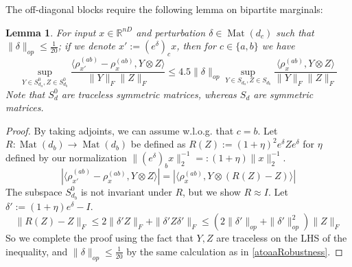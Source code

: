 \documentclass[aos]{imsart}
\newtheorem{lemma}[theorem]{Lemma}
\theoremstyle{definition}
\numberwithin{equation}{section}
\DeclareMathOperator{\Mat}{Mat}
\newcommand{\R}{{\mathbb{R}}}
\newcommand{\smallSym}{S}
\newcommand{\samp}{x}
\begin{document}
\begin{appendix}
The off-diagonal blocks require the following lemma on bipartite marginals:

\begin{lemma} \label{btoabRobustness}
For input $\samp \in \R^{nD}$ and perturbation $\delta \in \Mat(d_{c})$ such that $\|\delta\|_{op} \leq \frac{1}{20}$; if we denote $\samp' := (e^{\delta})_{c} \samp$, then for $c \in \{a,b\}$ we have
\[ \sup_{Y \in \smallSym_{d_{a}}^{0}, Z \in \smallSym_{d_{b}}^{0}} \frac{\langle \rho_{\samp'}^{(ab)} - \rho_{\samp}^{(ab)}, Y \otimes Z \rangle}{\|Y\|_{F} \|Z\|_{F}} \leq 4.5 \|\delta\|_{op} \sup_{Y \in \smallSym_{d_{a}}, Z \in \smallSym_{d_{b}}} \frac{\langle \rho_{\samp}^{(ab)}, Y \otimes Z \rangle}{\|Y\|_{F} \|Z\|_{F}}        \]
Note that $\smallSym_{d}^{0}$ are traceless symmetric matrices, whereas $\smallSym_{d}$ are symmetric matrices.
\end{lemma}
\begin{proof}
By taking adjoints, we can assume w.l.o.g. that $c = b$. Let $R : \Mat(d_{b}) \to \Mat(d_{b})$ be defined as $R(Z) := (1+\eta)^{2} e^{\delta} Z e^{\delta}$ for $\eta$ defined by our normalization $\|(e^{\delta})_{b} \samp\|_{2}^{-1} =: (1+\eta) \|\samp\|_{2}^{-1}$.
\[ |\langle \rho_{\samp'}^{(ab)} - \rho_{\samp}^{(ab)}, Y \otimes Z \rangle| = |\langle \rho_{\samp}^{(ab)}, Y \otimes (R(Z) - Z) \rangle|  \]
The subspace $\smallSym_{d_{b}}^{0}$ is not invariant under $R$, but we show $R \approx I$. Let $\delta' := (1+\eta) e^{\delta} - I$.
\[ \|R(Z) - Z\|_{F} \leq 2 \|\delta' Z\|_{F} + \|\delta' Z \delta'\|_{F} \leq (2 \|\delta'\|_{op} + \|\delta'\|_{op}^{2}) \|Z\|_{F}    \]
So we complete the proof using the fact that $Y,Z$ are traceless on the LHS of the inequality, and $\|\delta\|_{op} \leq \frac{1}{20}$ by the same calculation as in \cref{atoaaRobustness}.
\end{proof}


\end{appendix}
\end{document}
